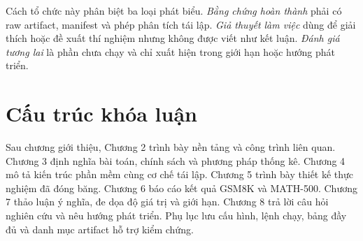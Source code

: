Cách tổ chức này phân biệt ba loại phát biểu. \emph{Bằng chứng hoàn thành} phải
có raw artifact, manifest và phép phân tích tái lập. \emph{Giả thuyết làm việc}
dùng để giải thích hoặc đề xuất thí nghiệm nhưng không được viết như kết luận.
\emph{Đánh giá tương lai} là phần chưa chạy và chỉ xuất hiện trong giới hạn hoặc
hướng phát triển.

\section{Cấu trúc khóa luận}

Sau chương giới thiệu, Chương 2 trình bày nền tảng và công trình liên quan.
Chương 3 định nghĩa bài toán, chính sách và phương pháp thống kê. Chương 4 mô tả
kiến trúc phần mềm cùng cơ chế tái lập. Chương 5 trình bày thiết kế thực nghiệm
đã đóng băng. Chương 6 báo cáo kết quả GSM8K và MATH-500. Chương 7 thảo luận ý
nghĩa, đe dọa độ giá trị và giới hạn. Chương 8 trả lời câu hỏi nghiên cứu và nêu
hướng phát triển. Phụ lục lưu cấu hình, lệnh chạy, bảng đầy đủ và danh mục
artifact hỗ trợ kiểm chứng.
